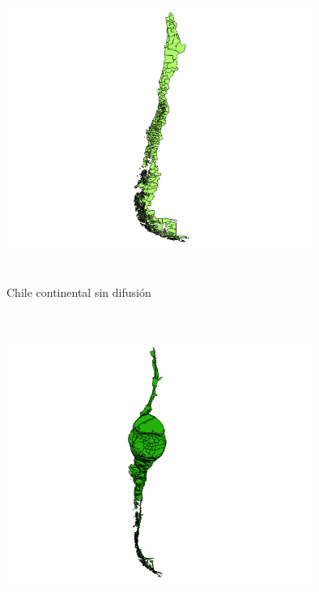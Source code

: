 \documentclass[20pt]{report}
\begin{document}
\begin{itemize}
\pagebreak

\begin{figure}[H]
\begin{center}
\includegraphics[width=10cm, height=10cm]{Chile.png}
\vspace{-0.5cm} %
\caption{Chile continental sin difusi\'on}
\label{Label para referencia}
\end{center}
\end{figure}
\begin{figure}[H]
\begin{center}
\includegraphics[width=10cm, height=10cm]{cartograma.png}
\vspace{-0.5cm} %

\end{center}
\end{figure}
\end{itemize}
\end{document}
